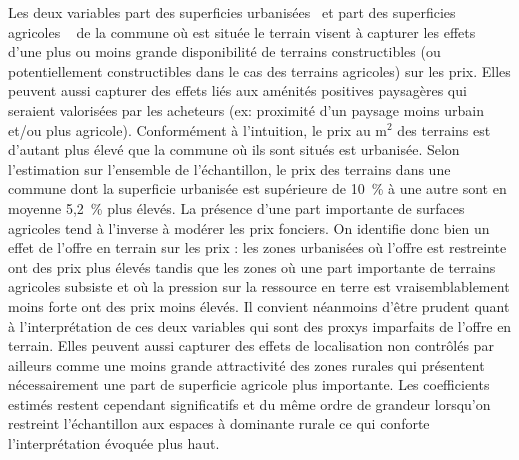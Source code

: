 \documentclass[10.5pt,a4paper]{article}
\begin{document}
{Les deux variables \og part des superficies urbanisées\fg~ et \og part des superficies agricoles \fg~ de la commune où est située le terrain visent à capturer les effets d'une plus ou moins grande disponibilité de terrains constructibles (ou potentiellement constructibles dans le cas des terrains agricoles) sur les prix. Elles peuvent aussi capturer des effets liés aux aménités positives paysagères qui seraient valorisées par les acheteurs (ex: proximité d'un paysage moins urbain et/ou plus agricole). Conformément à l'intuition, le prix au m$^2$ des terrains est d'autant plus élevé que la commune où ils sont situés est urbanisée. Selon l'estimation sur l'ensemble de l'échantillon, le prix des terrains dans une commune dont la superficie urbanisée est supérieure de 10~\% à une autre sont en moyenne 5,2~\% plus élevés. La présence d'une part importante de surfaces agricoles tend à l'inverse à modérer les prix fonciers. On identifie donc bien un effet de l'offre en terrain sur les prix : les zones urbanisées où l'offre est restreinte ont des prix plus élevés tandis que les zones où une part importante de terrains agricoles subsiste et où la pression sur la ressource en terre est vraisemblablement moins forte ont des prix moins élevés. Il convient néanmoins d'être prudent quant à l'interprétation de ces deux variables qui sont des proxys imparfaits de l'offre en terrain. Elles peuvent aussi capturer des effets de localisation non contrôlés par ailleurs comme une moins grande attractivité des zones rurales qui présentent nécessairement une part de superficie agricole plus importante. Les coefficients estimés restent cependant significatifs et du même ordre de grandeur lorsqu'on restreint l'échantillon aux espaces à dominante rurale ce qui conforte l'interprétation évoquée plus haut.\par  

}
\end{document}
